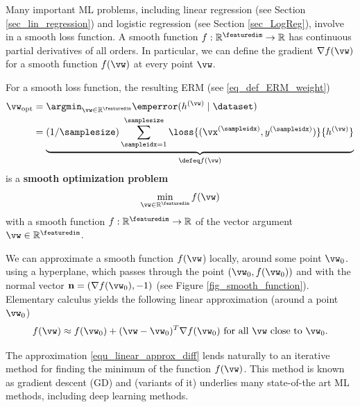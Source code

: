 \documentclass[12pt]{report}
\begin{document}
Many important ML problems, including linear regression (see Section \ref{sec_lin_regression}) 
and logistic regression (see Section \ref{sec_LogReg}), involve in a smooth loss 
function. A smooth function $f: \mathbb{R}^{\featuredim} \rightarrow \mathbb{R}$ 
has continuous partial derivatives of all orders. In particular, we can define the 
gradient $\nabla f(\vw)$ for a smooth function $f(\vw)$ at every point $\vw$.

For a smooth loss function, the resulting ERM (see \eqref{eq_def_ERM_weight})  
\begin{align}
\label{equ_def_ERM_continous}
\vw_{\rm opt} & = \argmin_{\vw \in \mathbb{R}^{\featuredim}}  \emperror( h^{(\vw)} \mid \dataset)  \nonumber \\
& = \underbrace{(1/\samplesize) \sum_{\sampleidx=1}^{\samplesize} \loss{(\vx^{(\sampleidx)},y^{(\sampleidx)})}{h^{(\vw)}}}_{\defeq f(\vw)} 
\end{align} 
is a {\bf smooth optimization problem}
\begin{equation}
\label{equ_generic_smooth_problem}
\min_{\vw \in \mathbb{R}^{\featuredim}} f(\vw)
\end{equation} 
with a smooth function $f: \mathbb{R}^{\featuredim} \rightarrow \mathbb{R}$ of 
the vector argument $\vw \in \mathbb{R}^{\featuredim}$. 

We can approximate a smooth function $f(\vw$) locally, around some point $\vw_{0}$. 
using a hyperplane, which passes through the point $(\vw_{0},f(\vw_{0}))$ and 
with the normal vector $\mathbf{n} = (\nabla f(\vw_{0}),-1)$ (see Figure \ref{fig_smooth_function}). 
Elementary calculus yields the following linear approximation (around a point $\vw_{0}$) 
\cite{RudinBookPrinciplesMatheAnalysis}
\begin{equation} 
\label{equ_linear_approx_diff}
f(\vw) \approx f(\vw_{0}) + (\vw-\vw_{0})^{T} \nabla f(\vw_{0}) \mbox{ for  all }\vw \mbox{ close to } \vw_{0}.
\end{equation}  

The approximation \eqref{equ_linear_approx_diff} lends naturally to an 
iterative method for finding the minimum of the function $f(\vw)$. This 
method is known as gradient descent (GD) and (variants of it) underlies 
many state-of-the art ML methods, including deep learning methods. 
\end{document}
